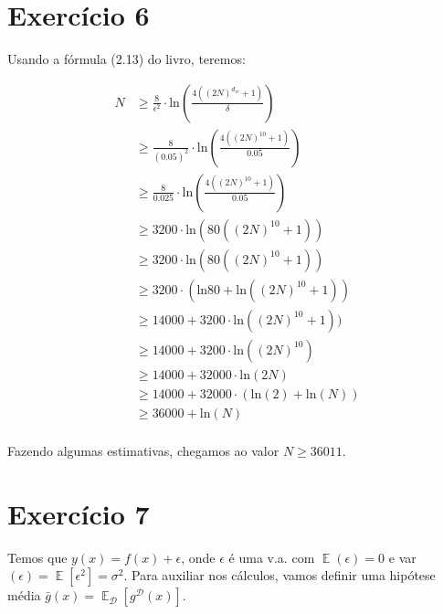 \documentclass[12pt,letterpaper]{article}
\DeclareMathOperator{\expv}{\mathbb{E}}
\DeclareMathOperator{\data}{\mathcal{D}}
\begin{document}
	\section*{Exercício 6}
	
	Usando a fórmula (2.13) do livro, teremos:
	
	\begin{equation*}
		\begin{split}
			N & \geq \frac{8}{\epsilon^2} \cdot\text{ln}\left(\frac{4((2N)^{d_{vc}}+1)}{\delta}\right) \\
			& \geq \frac{8}{(0.05)^2} \cdot\text{ln}\left(\frac{4((2N)^{10}+1)}{0.05}\right) \\
			& \geq \frac{8}{0.025} \cdot\text{ln}\left(\frac{4((2N)^{10}+1)}{0.05}\right) \\
			& \geq 3200 \cdot\text{ln}(80((2N)^{10}+1)) \\
			& \geq 3200 \cdot\text{ln}(80((2N)^{10}+1)) \\
			& \geq 3200\cdot(\text{ln}80 + \text{ln}((2N)^{10}+1)) \\
			& \geq 14000 + 3200 \cdot\text{ln}((2N)^{10}+1))\\
			& \geq 14000 + 3200 \cdot\text{ln}((2N)^{10}) \\
			& \geq 14000 + 32000\cdot\text{ln}(2N) \\
			& \geq 14000 + 32000\cdot(\text{ln}(2) + \text{ln}(N)) \\
			& \geq 36000 + \text{ln}(N) \\ 
		\end{split}
	\end{equation*}
	
	Fazendo algumas estimativas, chegamos ao valor $ N \geq 36011 $.
	
	\section*{Exercício 7}
	
	Temos que $ y(x) = f(x) + \epsilon$, onde $ \epsilon $ é uma v.a. com $ \expv(\epsilon) = 0 $ e  var$(\epsilon) = \expv[\epsilon^2] = \sigma^2 $. Para auxiliar nos cálculos, vamos definir uma hipótese média $\bar{g}(x) = \expv_{\data}[g^{\data}(x)]$.
	
\end{document}
